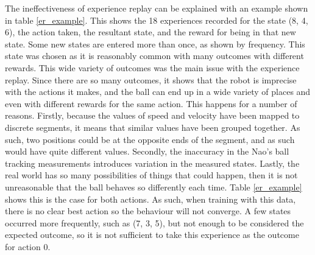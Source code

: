 \documentclass[12pt,a4paper]{article}
\begin{document}
The ineffectiveness of experience replay can be explained with an example shown in table \ref{er_example}. This shows the 18 experiences recorded for the state (8, 4, 6), the action taken, the resultant state, and the reward for being in that new state. Some new states are entered more than once, as shown by frequency. This state was chosen as it is reasonably common with many outcomes with different rewards. This wide variety of outcomes was the main issue with the experience replay. Since there are so many outcomes, it shows that the robot is imprecise with the actions it makes, and the ball can end up in a wide variety of places and even with different rewards for the same action. This happens for a number of reasons. Firstly, because the values of speed and velocity have been mapped to discrete segments, it means that similar values have been grouped together. As such, two positions could be at the opposite ends of the segment, and as such would have quite different values. Secondly, the inaccuracy in the Nao's ball tracking measurements introduces variation in the measured states. Lastly, the real world has so many possibilities of things that could happen, then it is not unreasonable that the ball behaves so differently each time. Table \ref{er_example} shows this is the case for both actions. As such, when training with this data, there is no clear best action so the behaviour will not converge. A few states occurred more frequently, such as (7, 3, 5), but not enough to be considered the expected outcome, so it is not sufficient to take this experience as the outcome for action 0. 

\end{document}
